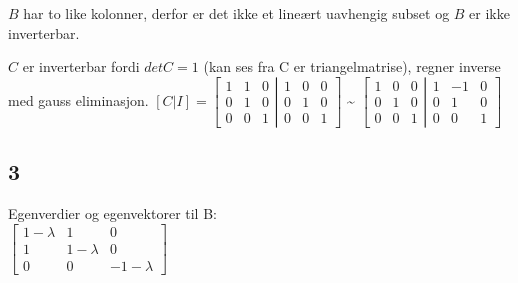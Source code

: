 \documentclass{article}
\begin{document}
$B$ har to like kolonner, derfor er det ikke et lineært uavhengig subset og $B$ er ikke inverterbar.

$C$ er inverterbar fordi $detC=1$ (kan ses fra C er triangelmatrise), regner inverse med gauss eliminasjon.
$[C|I]=
\left [
    \begin{matrix}
        1 & 1 & 0\\
        0 & 1 & 0\\
        0 & 0 & 1
    \end{matrix}
\left |
    \begin{matrix}
        1 & 0 & 0\\
        0 & 1 & 0\\
        0 & 0 & 1
    \end{matrix}
\right .
\right ]
$
\textasciitilde
$
\left [
    \begin{matrix}
        1 & 0 & 0\\
        0 & 1 & 0\\
        0 & 0 & 1
    \end{matrix}
\left |
    \begin{matrix}
        1 & -1 & 0\\
        0 & 1 & 0\\
        0 & 0 & 1
    \end{matrix}
\right .
\right ]
$

\subsection*{3}

Egenverdier og egenvektorer til B:\\
$
\left [
    \begin{matrix}
        1-\lambda & 1 & 0\\
        1 & 1-\lambda & 0\\
        0 & 0 & -1-\lambda
    \end{matrix}
\right ]
$
\end{document}
